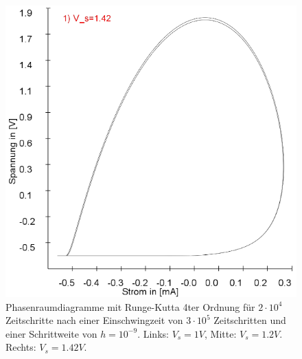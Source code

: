 \documentclass[12pt,a4paper]{article}
\begin{document}
\begin{figure}[!htbp]
\includegraphics[scale=0.26]{schwing-runge-nach300k-weitere20k-10-9-1,42V}
\caption{Phasenraumdiagramme mit Runge-Kutta 4ter Ordnung für $2\cdot10^4$ Zeitschritte nach einer Einschwingzeit von  $3\cdot10^5$ Zeitschritten und einer Schrittweite von $h=10^{-9}$. Links: $V_s=1V$, Mitte: $V_s=1.2V$. Rechts: $V_s=1.42V$.}
\label{fig:ldr-0002}
\end{figure}
\end{document}
